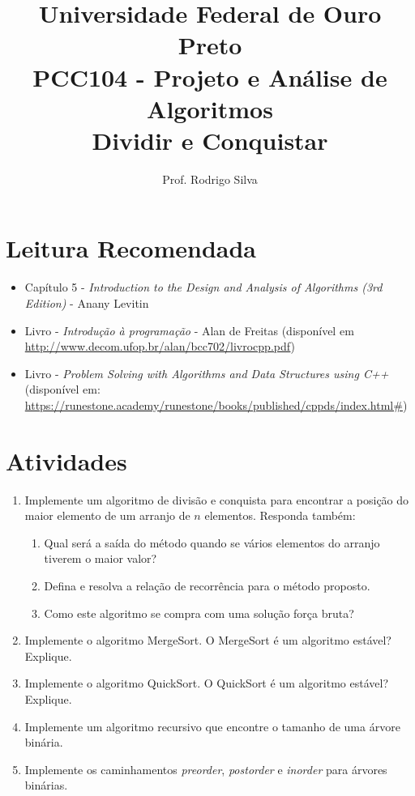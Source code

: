\documentclass{article}
\title{\vspace{-2 cm}Universidade Federal de Ouro Preto \\ PCC104 - Projeto e Análise de Algoritmos \\ Dividir e Conquistar}
\author{Prof. Rodrigo Silva}
\begin{document}
\maketitle

\section{Leitura Recomendada}

\begin{itemize}
    \item Capítulo 5 - \textit{Introduction to the Design and Analysis of Algorithms (3rd Edition)} - Anany Levitin 
    \item Livro - \textit{Introdução à programação} - Alan de Freitas (disponível em \url{http://www.decom.ufop.br/alan/bcc702/livrocpp.pdf})
    \item Livro - \textit{Problem Solving with Algorithms and Data Structures using C++} (disponível em: \url{https://runestone.academy/runestone/books/published/cppds/index.html#})
\end{itemize}


\section{Atividades}

\begin{enumerate}
    \item Implemente um algoritmo de divisão e conquista para encontrar a posição do maior elemento de um arranjo de $n$ elementos. Responda também: %
    \begin{enumerate} 
        \item Qual será a saída do método quando se vários elementos do arranjo tiverem o maior valor?
        \item Defina e resolva a relação de recorrência para o método proposto.
        \item Como este algoritmo se compra com uma solução força bruta?
    \end{enumerate}
    \item Implemente o algoritmo MergeSort. O MergeSort é um algoritmo estável? Explique.
    \item Implemente o algoritmo QuickSort. O QuickSort é um algoritmo estável? Explique.
    \item Implemente um algoritmo recursivo que encontre o tamanho de uma árvore binária.
    \item Implemente os caminhamentos \textit{preorder}, \textit{postorder} e \textit{inorder} para árvores binárias.
     
\end{enumerate}
\end{document}
